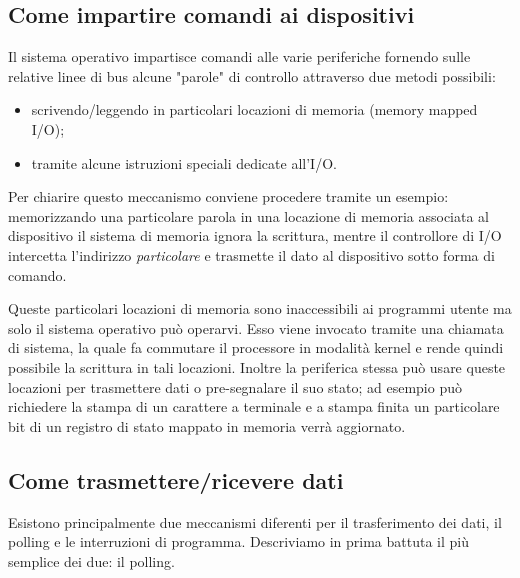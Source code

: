 \documentclass[class=book, crop=false, oneside]{standalone}
\begin{document}
\subsection{Come impartire comandi ai dispositivi}
Il sistema operativo impartisce comandi alle varie periferiche fornendo sulle relative linee di bus alcune "parole" di controllo attraverso due metodi possibili:
\begin{itemize}
	\item scrivendo/leggendo in particolari locazioni di memoria (memory mapped I/O);
	\item tramite alcune istruzioni speciali dedicate all'I/O.
\end{itemize}
Per chiarire questo meccanismo conviene procedere tramite un esempio:
memorizzando una particolare parola in una locazione di memoria associata al dispositivo il sistema di memoria ignora la scrittura, mentre il controllore di I/O intercetta l'indirizzo \emph{particolare} e trasmette il dato al dispositivo sotto forma di comando.

Queste particolari locazioni di memoria sono inaccessibili ai programmi utente ma solo il sistema operativo può operarvi. Esso viene invocato tramite una chiamata di sistema, la quale fa commutare il processore in modalità kernel e rende quindi possibile la scrittura in tali locazioni. Inoltre la periferica stessa può usare queste locazioni per trasmettere dati o pre-segnalare il suo stato; ad esempio può richiedere la stampa di un carattere a terminale e a stampa finita un particolare bit di un registro di stato mappato in memoria verrà aggiornato.

\subsection{Come trasmettere/ricevere dati}
Esistono principalmente due meccanismi diferenti per il trasferimento dei dati, il polling e le interruzioni di programma. Descriviamo in prima battuta il più semplice dei due: il polling.
\end{document}
